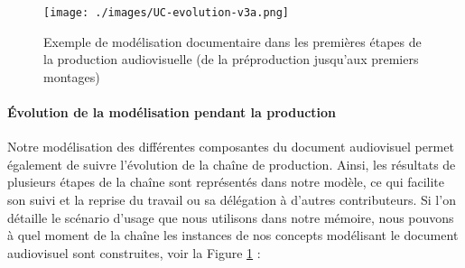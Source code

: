 \begin{figure}[htb!]
\centering
\texttt{[image: ./images/UC-evolution-v3a.png]}
\caption{Exemple de modélisation documentaire dans les premières étapes de la production audiovisuelle (de la préproduction jusqu'aux premiers montages)}
\label{img:uc-evo1}
\end{figure}

\paragraph{Évolution de la modélisation pendant la production}
Notre modélisation des différentes composantes du document audiovisuel permet également de suivre l'évolution de la chaîne de production. 
Ainsi, les résultats de plusieurs étapes de la chaîne sont représentés dans notre modèle, ce qui facilite son suivi et la reprise du travail ou sa délégation à d'autres contributeurs.
Si l'on détaille le scénario d'usage que nous utilisons dans notre mémoire, nous pouvons à quel moment de la chaîne les instances de nos concepts modélisant le document audiovisuel sont construites, voir la Figure \ref{img:uc-evo1} :
